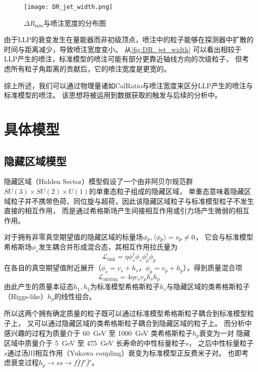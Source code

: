\begin{figure}[ht]
    \centering
    \texttt{[image: DR\_jet\_width.png]}
    \caption{$\Delta R_{\min}$与喷注宽度的分布图}
    \label{fig:DR_jet_width}
\end{figure}

由于LLP的衰变发生在量能器而非初级顶点，喷注中的粒子能够在探测器中扩散的时间与距离减少，导致喷注宽度变小。
从\autoref{fig:DR_jet_width} 可以看出相较于LLP产生的喷注，标准模型的喷注可能有部分更靠近轴线方向的次级粒子，
但考虑所有粒子角距离的贡献后，它的喷注宽度是更宽的。

综上所述，我们可以通过物理量诸如CalRatio与喷注宽度来区分LLP产生的喷注与标准模型的喷注。
该思想将被运用到数据获取的触发与后续的分析中。


\section{具体模型}

\subsection{隐藏区域模型}
隐藏区域（Hidden Sector）模型假设了一个由非阿贝尔规范群$SU(3)\times SU(2) \times U(1)$的单重态粒子组成的隐藏区域，
单重态意味着隐藏区域粒子并不携带色荷、同位旋与超荷，因此该隐藏区域粒子与标准模型粒子不发生直接的相互作用，
而是通过希格斯场产生间接相互作用或引力场产生微弱的相互作用。
\cite{hidden_sector}

对于拥有非零真空期望值的隐藏区域的标量场$\phi_p, \ev{\phi_p}=v_p \neq 0$，
它会与标准模型希格斯场$\phi_s$发生耦合并形成混合态，其相互作用拉氏量为
\begin{equation}
    \mathcal{L}_\text{link} = \eta \phi^\dagger_s \phi_s \phi^\dagger_p \phi_p
\end{equation}
在各自的真空期望值附近展开（$\phi_s = v_s + h_s$，$\phi_p = v_p + h_p$），得到质量混合项
\begin{equation}
    \mathcal{L}_\text{mixing} = 4 \eta v_s v_p h_s h_p
\end{equation}
由此产生的质量本征态$h_1, h_2$为标准模型希格斯粒子$h_s$与隐藏区域的类希格斯粒子（Higgs-like）$h_p$的线性组合。

所以这两个拥有确定质量的粒子既可以通过标准模型希格斯粒子耦合到标准模型粒子上，
又可以通过隐藏区域的类希格斯粒子耦合到隐藏区域的粒子上。
而分析中感兴趣的过程为质量介于 \SI{60}{GeV} 至 \SI{1000}{GeV} 类希格斯粒子$h_p$衰变为一对
隐藏区域中质量介于 \SI{5}{GeV} 至 \SI{475}{GeV} 长寿命的中性标量粒子$s$，
之后中性标量粒子$s$通过汤川相互作用（Yukawa coupling）衰变为标准模型正反费米子对。
也即考虑衰变过程$h_p \rightarrow ss \rightarrow f \bar{f} f' \bar{f}'$。

